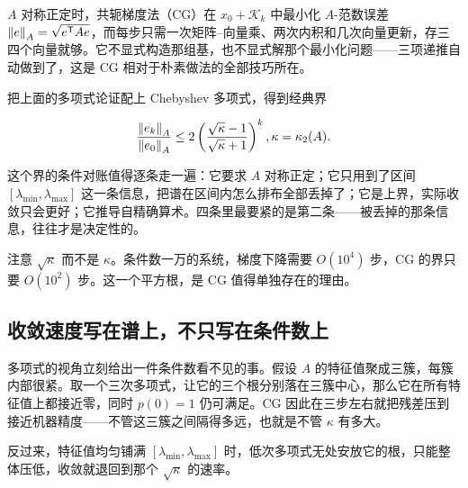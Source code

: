\(A\) 对称正定时，共轭梯度法（CG）在 \(x_0+\mathcal K_k\) 中最小化 \(A\)-范数误差 \(\left\lVert e\right\rVert_A=\sqrt{e^{\mathsf{T}}Ae}\)，而每步只需一次矩阵--向量乘、两次内积和几次向量更新，存三四个向量就够。它不显式构造那组基，也不显式解那个最小化问题——三项递推自动做到了，这是 CG 相对于朴素做法的全部技巧所在。

把上面的多项式论证配上 Chebyshev 多项式，得到经典界

\[
\frac{\left\lVert e_k\right\rVert_A}{\left\lVert e_0\right\rVert_A}\le 2\left(\frac{\sqrt\kappa-1}{\sqrt\kappa+1}\right)^{k},
\space \kappa=\kappa_2(A).
\]

这个界的条件对账值得逐条走一遍：它要求 \(A\) 对称正定；它只用到了区间 \([\lambda_{\min},\lambda_{\max}]\) 这一条信息，把谱在区间内怎么排布全部丢掉了；它是上界，实际收敛只会更好；它推导自精确算术。四条里最要紧的是第二条——被丢掉的那条信息，往往才是决定性的。

注意 \(\sqrt\kappa\) 而不是 \(\kappa\)。条件数一万的系统，梯度下降需要 \(O(10^4)\) 步，CG 的界只要 \(O(10^2)\) 步。这一个平方根，是 CG 值得单独存在的理由。

\subsection{收敛速度写在谱上，不只写在条件数上}

多项式的视角立刻给出一件条件数看不见的事。假设 \(A\) 的特征值聚成三簇，每簇内部很紧。取一个三次多项式，让它的三个根分别落在三簇中心，那么它在所有特征值上都接近零，同时 \(p(0)=1\) 仍可满足。CG 因此在三步左右就把残差压到接近机器精度——不管这三簇之间隔得多远，也就是不管 \(\kappa\) 有多大。

反过来，特征值均匀铺满 \([\lambda_{\min},\lambda_{\max}]\) 时，低次多项式无处安放它的根，只能整体压低，收敛就退回到那个 \(\sqrt\kappa\) 的速率。

